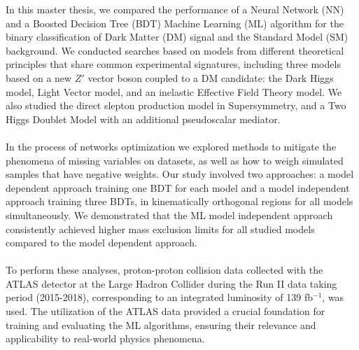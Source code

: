 \documentclass[12pt, a4paper]{book}
\begin{document}
In this master thesis, we compared the performance of a Neural Network (NN) and a Boosted Decision Tree (BDT) Machine Learning (ML) algorithm for the binary classification of Dark Matter (DM) signal and the Standard Model (SM) background. We conducted searches based on models from different theoretical principles that share common experimental signatures, 
including three models based on a new $Z'$ vector boson coupled to a DM candidate: the Dark Higgs model, Light Vector model, and an inelastic Effective Field Theory model. We also studied the direct slepton production model in Supersymmetry, and a Two Higgs Doublet Model with an additional pseudoscalar mediator. \\
\\In the process of networks optimization we explored methods to mitigate the phenomena of missing variables on datasets, as well as how to weigh simulated samples that have negative weights. Our study involved two approaches: a model dependent 
approach training one BDT for each model and a model independent approach training three BDTs, in kinematically orthogonal regions for all models simultaneously. We demonstrated that the ML model independent approach consistently achieved higher mass exclusion limits for all studied models compared to the model dependent approach. \\
\\To perform these analyses, proton-proton collision data collected with the ATLAS detector at the Large Hadron Collider during the Run II data taking period (2015-2018), corresponding to an integrated luminosity of 139 fb$^{-1}$, was used. The utilization of the ATLAS data provided a crucial foundation for training and evaluating the ML algorithms, 
ensuring their relevance and applicability to real-world physics phenomena.

\end{document}

